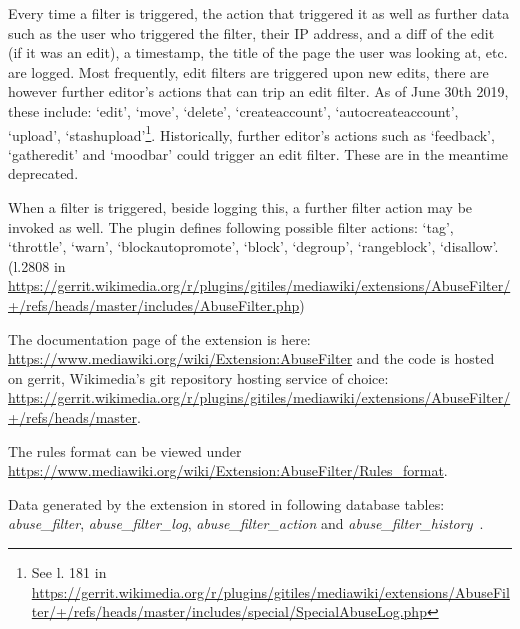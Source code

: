 Every time a filter is triggered, the action that triggered it as well as further data such as the user who triggered the filter, their IP address, and a diff of the edit (if it was an edit), a timestamp, the title of the page the user was looking at, etc. are logged.
Most frequently, edit filters are triggered upon new edits, there are however further editor's actions that can trip an edit filter.
As of June 30th 2019, these include: `edit', `move', `delete', `createaccount', `autocreateaccount', `upload', `stashupload'\footnote{See l. 181 in \url{https://gerrit.wikimedia.org/r/plugins/gitiles/mediawiki/extensions/AbuseFilter/+/refs/heads/master/includes/special/SpecialAbuseLog.php}}.
Historically, further editor's actions such as `feedback', `gatheredit' and `moodbar' could trigger an edit filter.
These are in the meantime deprecated. %

When a filter is triggered, beside logging this, a further filter action may be invoked as well.
The plugin defines following possible filter actions:
`tag', `throttle', `warn', `blockautopromote', `block', `degroup', `rangeblock', `disallow'. (l.2808 in \url{https://gerrit.wikimedia.org/r/plugins/gitiles/mediawiki/extensions/AbuseFilter/+/refs/heads/master/includes/AbuseFilter.php})

The documentation page of the extension is here: \url{https://www.mediawiki.org/wiki/Extension:AbuseFilter}
and the code is hosted on gerrit, Wikimedia's git repository hosting service of choice: \url{https://gerrit.wikimedia.org/r/plugins/gitiles/mediawiki/extensions/AbuseFilter/+/refs/heads/master}.

The rules format can be viewed under \url{https://www.mediawiki.org/wiki/Extension:AbuseFilter/Rules_format}.

Data generated by the extension in stored in following database tables: \emph{abuse\_filter}, \emph{abuse\_filter\_log}, \emph{abuse\_filter\_action} and \emph{abuse\_filter\_history}~\cite{gerrit-abusefilter}.

